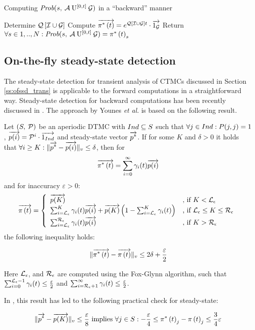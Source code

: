 \documentclass{entcs}
\newcommand{\SubSection}[1]{\subsection{#1}}
\begin{document}
		\begin{algorithm}
			\caption{Computing $\mbox{\it Prob}(s, \: \mathcal{A} \: \mathrm{U}^{[0,t]} \: \mathcal{G} )$ in a ``backward'' manner}
			\label{alg:bwd}
			\begin{algorithmic}[1]
				\STATE Determine $\mathcal{Q}\left[ \mathcal{I} \cup \mathcal{G} \right]$
				\STATE Compute $\overrightarrow{\pi^{*} \left( t \right)} = e^{\mathcal{Q}\left[ \mathcal{I} \cup \mathcal{G} \right] t} \cdot \overrightarrow{1_{\mathcal{G}}}$
				\STATE Return $\forall s \in 1,..,N : \mbox{\it Prob}(s, \: \mathcal{A} \: \mathrm{U}^{[0,t]} \: \mathcal{G} ) = \pi^{*} \left( t \right)_{s}$
			\end{algorithmic}
		\end{algorithm}
	
	\SubSection{On-the-fly steady-state detection  \label{ss:ussd}}
	
		The steady-state detection for transient analysis of CTMCs discussed in Section \ref{ss:ofssd_trans} is applicable to the forward computations in a straightforward way.
		Steady-state detection for backward computations has been recently discussed in \cite{YounesKNP_STTT05}.  The approach by Younes \emph{et al.} is based on the following result.

		\begin{theorem}
			\label{th:error_bwd_initial}
			Let $\left( S,\: \mathcal{P} \right)$ be an aperiodic DTMC with $Ind \subseteq S$ such that $\forall j \in Ind : P(j,j) = 1$, $\overrightarrow{p(i)}=\mathcal{P}^{i} \cdot \overrightarrow{1_{Ind}}$ and steady-state vector $\overrightarrow{p^{*}}$. If for some $K$ and $\delta > 0$ it holds that $\forall i \geq K:\lVert \overrightarrow{p^{*}} - \overrightarrow{p(i)} \rVert_{v} \leq \delta$, then for
			{\small
			\[
				\overrightarrow{\pi^{*} \left( t \right)} = \sum_{i=0}^{\infty}\gamma_{i}(t) \overrightarrow{p(i)}
			\]
			}
			and for inaccuracy $\varepsilon > 0$:
			{\small
			\begin{equation}
				\displaystyle
				\overrightarrow{\pi \left( t \right) } = \left\{
				\begin{array}{ll}
					\overrightarrow{p(K)} & \text{, if } K < \mathcal{L}_{\epsilon}\\
					\sum_{i=\mathcal{L}_{\epsilon}}^{K}\gamma_{i}(t) \overrightarrow{p(i)} + \overrightarrow{p(K)} \left(1- \sum_{i=\mathcal{L}_{\epsilon}}^{K}\gamma_{i}(t) \right) & \text{, if } \mathcal{L}_{\epsilon} \leq K \leq \mathcal{R}_{\epsilon}\\
					\sum_{i=\mathcal{L}_{\epsilon}}^{\mathcal{R}_{\epsilon}}\gamma_{i}(t) \overrightarrow{p(i)} & \text{, if } K > \mathcal{R}_{\epsilon}\\
				\end{array}
				\right .
				\label{eq:ssd_LR_b}
			\end{equation}
			}
			the following inequality holds:
			{\small
			\begin{fframe}{0.5}{-0.0}
				\[
					\lVert  \overrightarrow{\pi^{*} \left( t \right)} - \overrightarrow{\pi \left( t \right) }  \rVert_{v} \leq 2 \delta + \frac{\varepsilon}{2}
				\]
			\end{fframe}
			}
			Here $\mathcal{L}_{\epsilon}$, and $\mathcal{R}_{\epsilon}$ are computed using the Fox-Glynn algorithm, such that $\sum_{i=0}^{\mathcal{L}_{\epsilon}{-}1} \gamma_{i}(t) \leq \frac{\varepsilon}{2}$ and $\sum_{i=\mathcal{R}_{\epsilon}{+}1}^{\infty} \gamma_{i}(t) \leq \frac{\varepsilon}{2}$.
		\end{theorem}
		In \cite{YounesKNP_STTT05}, this result has led to the following practical check for steady-state:
		\begin{fframe}{0.92}{-0.3}
			\begin{equation}
				\lVert \overrightarrow{p^{*}} - \overrightarrow{p(K)} \rVert_{v} \leq \frac{\varepsilon}{8} \text{ implies } \forall j \in S : -\frac{\varepsilon}{4} \leq \pi^{*} \left( t \right)_{j} - \pi \left( t \right)_{j} \leq \frac{3}{4}\varepsilon \label{eq:youn_cr_cor}
			\end{equation}
		\end{fframe}
		
\end{document}
